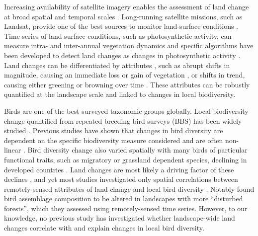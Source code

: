 Increasing availability of satellite imagery enables the assessment of land change at broad spatial and temporal scales \citep{Kennedy2014,Pasquarella2016}. Long-running satellite missions, such as Landsat, provide one of the best sources to monitor land-surface conditions \citep{Kennedy2014,Vogelmann2016,Hermosilla2018,Song2018}. Time series of land-surface conditions, such as photosynthetic activity, can measure intra- and inter-annual vegetation dynamics \citep{Pettorelli2005,Fisher2006} and specific algorithms have been developed to detect land changes as changes in photosynthetic activity \citep{Verbesselt2010,Zhu2017}. Land changes can be differentiated by attributes \citep{Watson2014}, such as abrupt shifts in magnitude, causing an immediate loss or gain of vegetation \citep{DeVries2015b}, or shifts in trend, causing either greening or browning over time \citep{dejong2013,Muller2014}. These attributes can be robustly quantified at the landscape scale and linked to changes in local biodiversity.

Birds are one of the best surveyed taxonomic groups globally. Local biodiversity change quantified from repeated breeding bird surveys (BBS) has been widely studied \citep{Harrison2014,Pardieck2018}. Previous studies have shown that changes in bird diversity are dependent on the specific biodiversity measure     considered \citep{Schipper2016,Jarzyna2017} and are often non-linear \citep{Gutzwiller2015,Barnagaud2017}. Bird diversity change also varied spatially \citep{Harrison2014,Jarzyna2017} with many birds of particular functional traits, such as migratory or grassland dependent species, declining in developed countries \citep{Fewster2000,Sanderson2006,Stanton2018}. Land changes are most likely a driving factor of these declines \citep{Harrison2014,Harrison2016}, and yet most studies investigated only spatial correlations between remotely-sensed attributes of land change and local bird diversity \citep{Rowhani2008,Goetz2014,Hobi2017}. Notably \cite{Rittenhouse2010} found bird assemblage composition to be altered in landscapes with more “disturbed forests”, which they assessed using remotely-sensed time series. However, to our knowledge, no previous study has investigated whether landscape-wide land changes correlate with and explain changes in local bird diversity.

